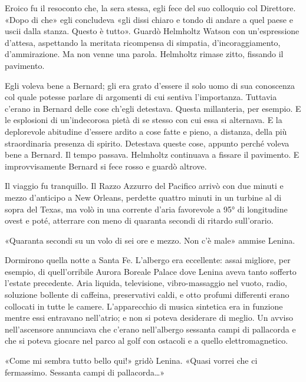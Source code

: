 \documentclass[
a5paper, %
10pt, %
twoside, 
onecolumn, %
openany, %
]{memoir}
\begin{document}
Eroico fu il resoconto che, la sera stessa, egli fece del suo colloquio col Direttore. «Dopo di che» egli concludeva «gli dissi chiaro e tondo di andare a quel paese e uscii dalla stanza. Questo è tutto». Guardò Helmholtz Watson con un’espressione d’attesa, aspettando la meritata ricompensa di simpatia, d’incoraggiamento, d’ammirazione. Ma non venne una parola. Helmholtz rimase zitto, fissando il pavimento.

Egli voleva bene a Bernard; gli era grato d’essere il solo uomo di sua conoscenza col quale potesse parlare di argomenti di cui sentiva l’importanza. Tuttavia c’erano in Bernard delle cose ch’egli detestava. Questa millanteria, per esempio. E le esplosioni di un’indecorosa pietà di se stesso con cui essa si alternava. E la deplorevole abitudine d’essere ardito a cose fatte e pieno, a distanza, della più straordinaria presenza di spirito. Detestava queste cose, appunto perché voleva bene a Bernard. Il tempo passava. Helmholtz continuava a fissare il pavimento. E improvvisamente Bernard si fece rosso e guardò altrove.

\newpage

\begin{center}
    {\huge\textbf{}}
\end{center}

Il viaggio fu tranquillo. Il Razzo Azzurro del Pacifico arrivò con due minuti e mezzo d’anticipo a New Orleans, perdette quattro minuti in un turbine al di sopra del Texas, ma volò in una corrente d’aria favorevole a 95° di longitudine ovest e poté, atterrare con meno di quaranta secondi di ritardo sull’orario.

«Quaranta secondi su un volo di sei ore e mezzo. Non c’è male» ammise Lenina.

Dormirono quella notte a Santa Fe. L’albergo era eccellente: assai migliore, per esempio, di quell’orribile Aurora Boreale Palace dove Lenina aveva tanto sofferto l’estate precedente. Aria liquida, televisione, vibro-massaggio nel vuoto, radio, soluzione bollente di caffeina, preservativi caldi, e otto profumi differenti erano collocati in tutte le camere. L’apparecchio di musica sintetica era in funzione mentre essi entravano nell’atrio; e non si poteva desiderare di meglio. Un avviso nell’ascensore annunciava che c’erano nell’albergo sessanta campi di pallacorda e che si poteva giocare nel parco al golf con ostacoli e a quello elettromagnetico.

«Come mi sembra tutto bello qui!» gridò Lenina. «Quasi vorrei che ci fermassimo. Sessanta campi di pallacorda…»
\end{document}
